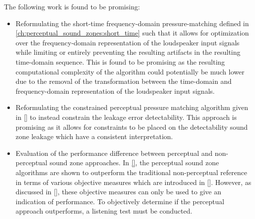 The following work is found to be promising:
\begin{itemize}
    \item Reformulating the short-time frequency-domain pressure-matching defined in \autoref{ch:perceptual_sound_zones:short_time}
        such that it allows for optimization over the frequency-domain representation of the loudspeaker input signals while 
        limiting or entirely preventing the resulting artifacts in the resulting time-domain sequence.
        This is found to be promising as the resulting computational complexity of the algorithm could potentially be much
        lower due to the removal of the transformation between the time-domain and frequency-domain representation of the
        loudspeaker input signals.
    \item Reformulating the constrained perceptual pressure matching algorithm given in \autoref{} to instead constrain the 
        leakage error detectability.
        This approach is promising as it allows for constraints to be placed on the detectability sound zone leakage which have 
        a consistent interpretation.
    \item Evaluation of the performance difference between perceptual and non-perceptual sound zone approaches.
        In \autoref{}, the perceptual sound zone algorithms are shown to outperform the traditional non-perceptual reference in terms of 
        various objective measures which are introduced in \autoref{}.
        However, as discussed in \autoref{}, these objective measures can only be used to give an indication of performance.
        To objectively determine if the perceptual approach outperforms, a listening test must be conducted.
\end{itemize}
